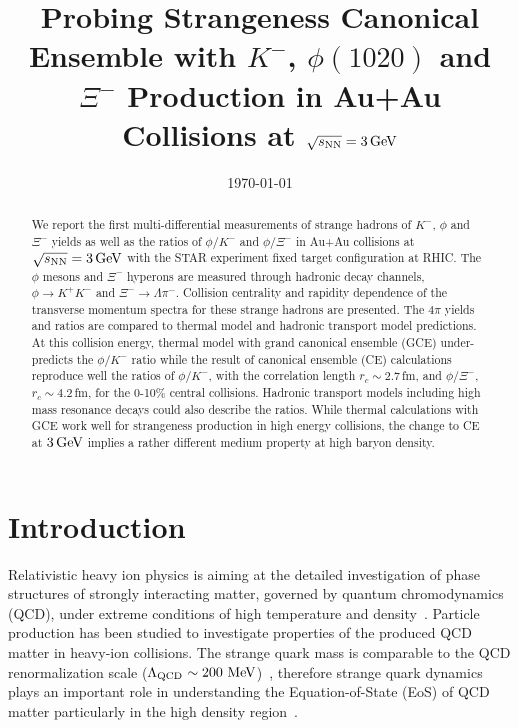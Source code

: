 \documentclass[aps,tightenlines,superscriptaddress,twocolumn]{revtex4-1}
\begin{document}
\title{Probing Strangeness Canonical Ensemble with $K^{-}$, $\phi(1020)$ and $\Xi^{-}$ Production in Au+Au Collisions at ${\sqrt{s_{\rm NN}} = \rm{3\,GeV}}$}%


%

\linenumbers

\date{\today}

\begin{abstract}
We report the first multi-differential measurements of strange hadrons of $K^{-}$, $\phi$ and $\Xi^{-}$ yields as well as the ratios of $\phi/K^-$ and $\phi/\Xi^-$ in Au+Au collisions at ${\sqrt{s_{\rm NN}} = \rm{3\,GeV}}$ with the STAR experiment fixed target configuration at RHIC. The $\phi$ mesons and $\Xi^{-}$ hyperons are measured through hadronic decay channels, $\phi\rightarrow K^+K^-$ and $\Xi^-\rightarrow \Lambda\pi^-$. 
Collision centrality and rapidity dependence of the transverse momentum spectra for these strange hadrons are presented. The $4\pi$ yields and ratios are compared to thermal model and hadronic transport model predictions.
At this collision energy, thermal model with grand canonical ensemble (GCE) under-predicts the $\phi/K^-$ ratio while the result of canonical ensemble (CE) calculations reproduce well the ratios of $\phi/K^-$, with the correlation length $r_c \sim 2.7$\,fm, and $\phi/\Xi^-$, $r_c \sim 4.2$\,fm, for the 0-10\% central collisions. Hadronic transport models including high mass resonance decays could also describe the ratios.
While thermal calculations with GCE work well for strangeness production in high energy collisions, the change to CE at $\rm{3\,GeV}$ implies a rather different medium property at high baryon density. 
\end{abstract}

\maketitle

\linenumbers

\section{Introduction}
\label{introduction}

Relativistic heavy ion physics is aiming at the detailed investigation of phase structures of strongly interacting matter, governed by quantum chromodynamics (QCD), under extreme conditions of high temperature and density~\cite{StarWhitePaper_2005,akiba2015hot,Busza_ARNPS:2018}. Particle production has been studied to investigate properties of the produced QCD matter in heavy-ion collisions. The strange quark mass is comparable to the QCD renormalization scale ($\Lambda_{\rm{QCD}}$\,$\sim\textup{200 MeV}$)~\cite{Rafelski:1982pu,Koch:1986ud}, 
therefore strange quark dynamics plays an important role in understanding the Equation-of-State (EoS) of QCD matter particularly in the high density region~\cite{KO.PhysRevLett.55.2661:1985,CASSING.openCharm.2001,Danielewicz1592:2002,KO_sQM2017,Ks0_Lambda_HADES:2019,Tetyana_ICNN:2020}. 
\end{document}
